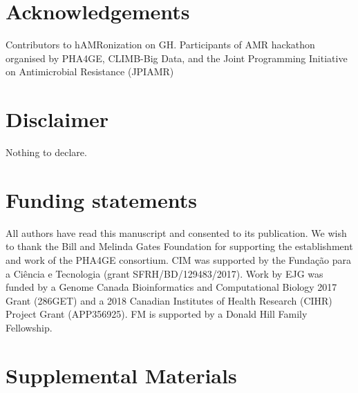 \section{Acknowledgements}

Contributors to hAMRonization on GH. Participants of AMR hackathon organised by PHA4GE, CLIMB-Big Data, and the Joint Programming Initiative on Antimicrobial Resistance (JPIAMR)

\section{Disclaimer}

Nothing to declare.

\section{Funding statements}

All authors have read this manuscript and consented to its publication. We wish to thank the Bill and Melinda Gates Foundation for supporting the establishment and work of the PHA4GE consortium. CIM was supported by the Fundação para a Ciência e Tecnologia (grant SFRH/BD/129483/2017). Work by EJG was funded by a Genome Canada Bioinformatics and Computational Biology 2017 Grant (286GET) and a 2018 Canadian Institutes of Health Research (CIHR) Project Grant (APP356925). FM is supported by a Donald Hill Family Fellowship. 


\section{Supplemental Materials}



